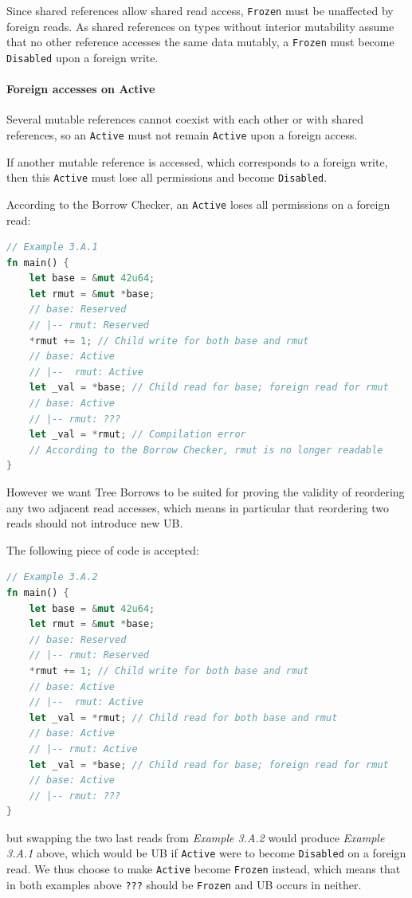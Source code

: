 \documentclass[a4paper,11pt]{article}
\theoremstyle{plain}
\theoremstyle{definition}
\theoremstyle{remark}
\newcommand{\tperm}[1]{\texttt{#1}}
\begin{document}
Since shared references allow shared read access, \tperm{Frozen} must be unaffected
by foreign reads. As shared references on types without interior mutability
assume that no other reference accesses the same data mutably, a \tperm{Frozen} must
become \tperm{Disabled} upon a foreign write.

\paragraph*{Foreign accesses on Active}

Several mutable references cannot coexist with each other or with shared
references, so an \tperm{Active} must not remain \tperm{Active} upon a foreign access.

If another mutable reference is accessed, which corresponds to a foreign write,
then this \tperm{Active} must lose all permissions and become \tperm{Disabled}.

According to the Borrow Checker, an \tperm{Active} loses all permissions on a foreign read:
\begin{lstlisting}[language=rust]
// Example 3.A.1
fn main() {
    let base = &mut 42u64;
    let rmut = &mut *base;
    // base: Reserved
    // |-- rmut: Reserved
    *rmut += 1; // Child write for both base and rmut
    // base: Active
    // |--  rmut: Active
    let _val = *base; // Child read for base; foreign read for rmut
    // base: Active
    // |-- rmut: ???
    let _val = *rmut; // Compilation error
    // According to the Borrow Checker, rmut is no longer readable
}
\end{lstlisting}

However we want Tree Borrows to be suited for proving the validity of reordering
any two adjacent read accesses, which means in particular that reordering two
reads should not introduce new UB.

The following piece of code is accepted:
\begin{lstlisting}[language=rust]
// Example 3.A.2
fn main() {
    let base = &mut 42u64;
    let rmut = &mut *base;
    // base: Reserved
    // |-- rmut: Reserved
    *rmut += 1; // Child write for both base and rmut
    // base: Active
    // |--  rmut: Active
    let _val = *rmut; // Child read for both base and rmut
    // base: Active
    // |-- rmut: Active
    let _val = *base; // Child read for base; foreign read for rmut
    // base: Active
    // |-- rmut: ???
}
\end{lstlisting}
but swapping the two last reads from \textit{Example 3.A.2} would produce \textit{Example 3.A.1} above,
which would be UB if \tperm{Active} were to become \tperm{Disabled} on a foreign read.
We thus choose to make \tperm{Active} become \tperm{Frozen} instead, which means that in
both examples above \tperm{???} should be \tperm{Frozen} and UB occurs in neither.
\end{document}

